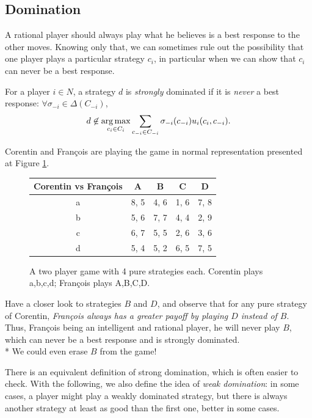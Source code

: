 \subsection{Domination}

A rational player should always play what he believes is a best response to the other moves. Knowing only that, we can sometimes rule out the possibility that one player plays a particular strategy $c_i$, in particular when we can show that $c_i$ can never be a best response. 

 \begin{definition}
 For a player $i \in N$, a strategy $d$ is \emph{strongly} dominated if it is \emph{never} a best response: $\forall \sigma_{-i} \in \Delta(C_{-i})$,
 $$ d \not \in \operatorname*{arg\,max}_{c_i \in C_i} \sum_{c_{-i} \in C_{-i}} \sigma_{-i}(c_{-i}) u_i(c_i, c_{-i}).$$ 
 \label{chap2:defdomibr}
 \end{definition}
 
\begin{example}
\label{chap2:exampleintrodomi}
Corentin and Fran\c{c}ois are  playing the game in normal representation presented at Figure \ref{chap2:videogame}.

 \begin{figure}[!h]
\centering
\begin{tabular}{c|cccc}
  Corentin vs Fran\c{c}ois &  A &  B & C & D\\ 
\hline a & 8, 5 &  4, 6 & 1, 6 & 7, 8 \\
 b & 5, 6 &  7, 7 & 4, 4 & 2, 9 \\
 c & 6, 7 &  5, 5 & 2, 6 & 3, 6 \\
 d & 5, 4 &  5, 2 & 6, 5 & 7, 5 \\
\end{tabular} 
\caption{A two player game with 4 pure strategies each. Corentin plays a,b,c,d; Fran\c{c}ois plays A,B,C,D.}
\label{chap2:videogame}
\end{figure}
Have a closer look to strategies $B$ and $D$, and observe that for any pure strategy of Corentin, \emph{Fran\c{c}ois always has a greater payoff by playing $D$ instead of $B$}. 
Thus, Fran\c{c}ois being an intelligent and rational player, he will never play $B$, which can never be a best response and is strongly dominated.\\*
We could even erase $B$ from the game!
\end{example}

There is an equivalent definition of strong domination, which is often easier to check. With the following, we also define the idea of \emph{weak domination}: in some cases, a player might play a weakly dominated strategy, but there is always another strategy at least as good than the first one, better in some cases.


